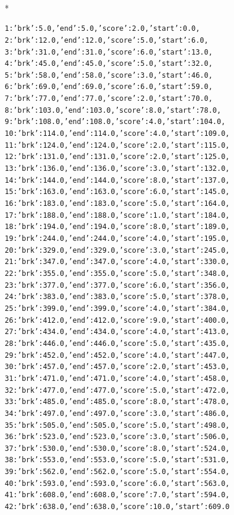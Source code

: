 \documentclass[letterpaper,10pt,english]{/usr/local/lib/python2.7/dist-packages/Sphinx-1.2b1-py2.7.egg/sphinx/texinputs/sphinxhowto}
\def\smaller{\fontsize{9.5pt}{9.5pt}\selectfont}
\newenvironment{InvisibleVerbatim}
        {\begin{mdframed}[leftmargin=0.1\linewidth,innerleftmargin=3pt,innerrightmargin=3pt, userdefinedwidth=1\linewidth, linewidth=0pt, linecolor=white, usetwoside=false]}
        {\end{mdframed}}
\begin{document}
                \makebox[0.1\linewidth]{\smaller\hfill\tt\color{nbframe-out-prompt}Out\hspace{4pt}{[}12{]}:\hspace{4pt}}\\*
                \vspace{-2.55\baselineskip}\begin{InvisibleVerbatim}
                \vspace{-0.5\baselineskip}
    \begin{alltt}{1: {'brk': 5.0, 'end': 5.0, 'score': 2.0, 'start': 0.0},
 2: {'brk': 12.0, 'end': 12.0, 'score': 5.0, 'start': 6.0},
 3: {'brk': 31.0, 'end': 31.0, 'score': 6.0, 'start': 13.0},
 4: {'brk': 45.0, 'end': 45.0, 'score': 5.0, 'start': 32.0},
 5: {'brk': 58.0, 'end': 58.0, 'score': 3.0, 'start': 46.0},
 6: {'brk': 69.0, 'end': 69.0, 'score': 6.0, 'start': 59.0},
 7: {'brk': 77.0, 'end': 77.0, 'score': 2.0, 'start': 70.0},
 8: {'brk': 103.0, 'end': 103.0, 'score': 8.0, 'start': 78.0},
 9: {'brk': 108.0, 'end': 108.0, 'score': 4.0, 'start': 104.0},
 10: {'brk': 114.0, 'end': 114.0, 'score': 4.0, 'start': 109.0},
 11: {'brk': 124.0, 'end': 124.0, 'score': 2.0, 'start': 115.0},
 12: {'brk': 131.0, 'end': 131.0, 'score': 2.0, 'start': 125.0},
 13: {'brk': 136.0, 'end': 136.0, 'score': 3.0, 'start': 132.0},
 14: {'brk': 144.0, 'end': 144.0, 'score': 8.0, 'start': 137.0},
 15: {'brk': 163.0, 'end': 163.0, 'score': 6.0, 'start': 145.0},
 16: {'brk': 183.0, 'end': 183.0, 'score': 5.0, 'start': 164.0},
 17: {'brk': 188.0, 'end': 188.0, 'score': 1.0, 'start': 184.0},
 18: {'brk': 194.0, 'end': 194.0, 'score': 8.0, 'start': 189.0},
 19: {'brk': 244.0, 'end': 244.0, 'score': 4.0, 'start': 195.0},
 20: {'brk': 329.0, 'end': 329.0, 'score': 3.0, 'start': 245.0},
 21: {'brk': 347.0, 'end': 347.0, 'score': 4.0, 'start': 330.0},
 22: {'brk': 355.0, 'end': 355.0, 'score': 5.0, 'start': 348.0},
 23: {'brk': 377.0, 'end': 377.0, 'score': 6.0, 'start': 356.0},
 24: {'brk': 383.0, 'end': 383.0, 'score': 5.0, 'start': 378.0},
 25: {'brk': 399.0, 'end': 399.0, 'score': 4.0, 'start': 384.0},
 26: {'brk': 412.0, 'end': 412.0, 'score': 9.0, 'start': 400.0},
 27: {'brk': 434.0, 'end': 434.0, 'score': 4.0, 'start': 413.0},
 28: {'brk': 446.0, 'end': 446.0, 'score': 5.0, 'start': 435.0},
 29: {'brk': 452.0, 'end': 452.0, 'score': 4.0, 'start': 447.0},
 30: {'brk': 457.0, 'end': 457.0, 'score': 2.0, 'start': 453.0},
 31: {'brk': 471.0, 'end': 471.0, 'score': 4.0, 'start': 458.0},
 32: {'brk': 477.0, 'end': 477.0, 'score': 5.0, 'start': 472.0},
 33: {'brk': 485.0, 'end': 485.0, 'score': 8.0, 'start': 478.0},
 34: {'brk': 497.0, 'end': 497.0, 'score': 3.0, 'start': 486.0},
 35: {'brk': 505.0, 'end': 505.0, 'score': 5.0, 'start': 498.0},
 36: {'brk': 523.0, 'end': 523.0, 'score': 3.0, 'start': 506.0},
 37: {'brk': 530.0, 'end': 530.0, 'score': 8.0, 'start': 524.0},
 38: {'brk': 553.0, 'end': 553.0, 'score': 5.0, 'start': 531.0},
 39: {'brk': 562.0, 'end': 562.0, 'score': 5.0, 'start': 554.0},
 40: {'brk': 593.0, 'end': 593.0, 'score': 6.0, 'start': 563.0},
 41: {'brk': 608.0, 'end': 608.0, 'score': 7.0, 'start': 594.0},
 42: {'brk': 638.0, 'end': 638.0, 'score': 10.0, 'start': 609.0}}\end{alltt}


\end{InvisibleVerbatim}
\end{document}
